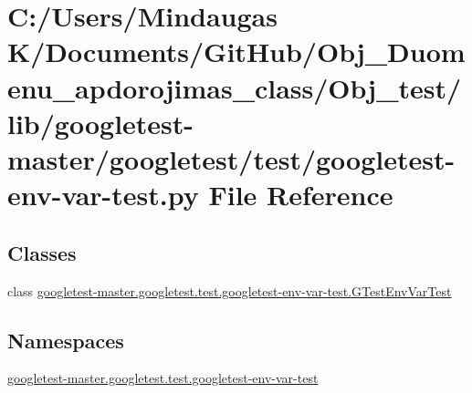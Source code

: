 \hypertarget{_obj__test_2lib_2googletest-master_2googletest_2test_2googletest-env-var-test_8py}{}\section{C\+:/\+Users/\+Mindaugas K/\+Documents/\+Git\+Hub/\+Obj\+\_\+\+Duomenu\+\_\+apdorojimas\+\_\+class/\+Obj\+\_\+test/lib/googletest-\/master/googletest/test/googletest-\/env-\/var-\/test.py File Reference}
\label{_obj__test_2lib_2googletest-master_2googletest_2test_2googletest-env-var-test_8py}
\subsection*{Classes}
\begin{DoxyCompactItemize}
\item 
class \mbox{\hyperlink{classgoogletest-master_1_1googletest_1_1test_1_1googletest-env-var-test_1_1_g_test_env_var_test}{googletest-\/master.\+googletest.\+test.\+googletest-\/env-\/var-\/test.\+G\+Test\+Env\+Var\+Test}}
\end{DoxyCompactItemize}
\subsection*{Namespaces}
\begin{DoxyCompactItemize}
\item 
 \mbox{\hyperlink{namespacegoogletest-master_1_1googletest_1_1test_1_1googletest-env-var-test}{googletest-\/master.\+googletest.\+test.\+googletest-\/env-\/var-\/test}}
\end{DoxyCompactItemize}
